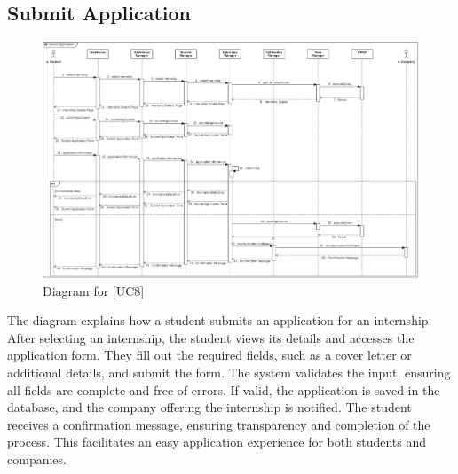\subsection{Submit Application}
\begin{figure} [H]
    \centering
    \includegraphics[width=1\linewidth]{DD/Images/Runtime Sequence Diagram Images/submit_application.png}
    \caption{Diagram for [UC8]}
    \label{fig: Submit Application Diagram}
\end{figure}
The diagram explains how a student submits an application for an internship. After selecting an internship, the student views its details and accesses the application form. They fill out the required fields, such as a cover letter or additional details, and submit the form. The system validates the input, ensuring all fields are complete and free of errors. If valid, the application is saved in the database, and the company offering the internship is notified. The student receives a confirmation message, ensuring transparency and completion of the process. This facilitates an easy application experience for both students and companies.

